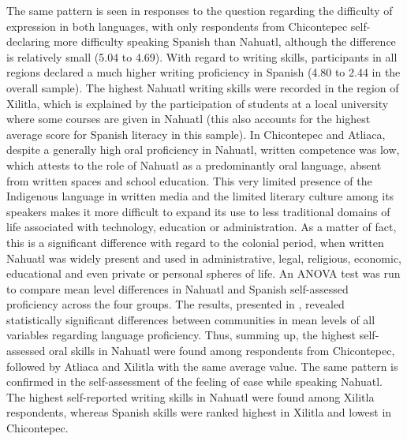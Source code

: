 \documentclass[output=paper,hidelinks]{langscibook}
\begin{document}
The same pattern is seen in responses to the question regarding the difficulty of expression in both languages, with only respondents from Chicontepec self-declaring more difficulty speaking Spanish than Nahuatl, although the difference is relatively small (5.04 to 4.69). With regard to writing skills, participants in all regions declared a much higher writing proficiency in Spanish (4.80 to 2.44 in the overall sample). The highest Nahuatl writing skills were recorded in the region of Xilitla, which is explained by the participation of students at a local university where some courses are given in Nahuatl (this also accounts for the highest average score for Spanish literacy in this sample). In Chicontepec and Atliaca, despite a generally high oral proficiency in Nahuatl, written competence was low, which attests to the role of Nahuatl as a predominantly oral language, absent from written spaces and school education. This very limited presence of the Indigenous language in written media and the limited literary culture among its speakers makes it more difficult to expand its use to less traditional domains of life associated with technology, education or administration. As a matter of fact, this is a significant difference with regard to the colonial period, when written Nahuatl was widely present and used in administrative, legal, religious, economic, educational and even private or personal spheres of life. An ANOVA test was run to compare mean level differences in Nahuatl and Spanish self-assessed proficiency across the four groups. The results, presented in , revealed statistically significant differences between communities in mean levels of all variables regarding language proficiency. Thus, summing up, the highest self-assessed oral skills in Nahuatl were found among respondents from Chicontepec, followed by Atliaca and Xilitla with the same average value. The same pattern is confirmed in the self-assessment of the feeling of ease while speaking Nahuatl. The highest self-reported writing skills in Nahuatl were found among Xilitla respondents, whereas Spanish skills were ranked highest in Xilitla and lowest in Chicontepec.
\end{document}
